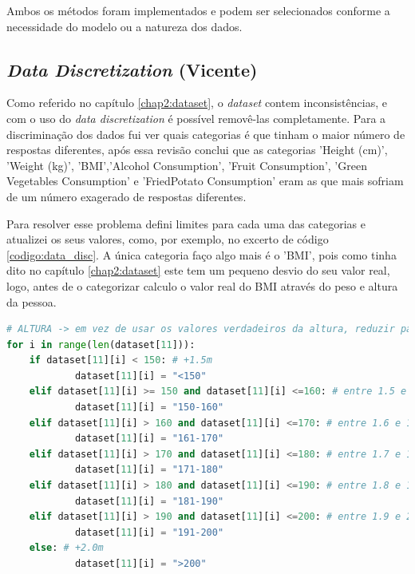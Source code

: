 Ambos os métodos foram implementados e podem ser selecionados conforme a necessidade do modelo ou a natureza dos dados.


\subsection{\textit{Data Discretization} (Vicente)}
\label{chap3:data_disc}

Como referido no capítulo \ref{chap2:dataset}, o \textit{dataset} contem inconsistências, e com o uso do \textit{data discretization} é possível removê-las completamente. Para a discriminação dos dados fui ver quais categorias é que tinham o maior número de respostas diferentes, após essa revisão conclui que as categorias 'Height (cm)', 'Weight (kg)', 'BMI','Alcohol Consumption', 'Fruit Consumption', 'Green Vegetables Consumption' e 'FriedPotato Consumption' eram as que mais sofriam de um número exagerado de respostas diferentes.

Para resolver esse problema defini limites para cada uma das categorias e atualizei os seus valores, como, por exemplo, no excerto de código \ref{codigo:data_disc}. A única categoria faço algo mais é o 'BMI', pois como tinha dito no capítulo \ref{chap2:dataset} este tem um pequeno desvio do seu valor real, logo, antes de o categorizar calculo o valor real do BMI através do peso e altura da pessoa.

\begin{lstlisting}[caption={Excerto de código utilizado para substituir todos os valores numericos da categoria 'Height (cm)' por valores categoricos.}, language=Python, label={codigo:data_disc}]
# ALTURA -> em vez de usar os valores verdadeiros da altura, reduzir para algumas categorias genericas
for i in range(len(dataset[11])):
    if dataset[11][i] < 150: # +1.5m
			dataset[11][i] = "<150"
    elif dataset[11][i] >= 150 and dataset[11][i] <=160: # entre 1.5 e 1.6 m
			dataset[11][i] = "150-160"
    elif dataset[11][i] > 160 and dataset[11][i] <=170: # entre 1.6 e 1.7 m
			dataset[11][i] = "161-170"
    elif dataset[11][i] > 170 and dataset[11][i] <=180: # entre 1.7 e 1.8 m
			dataset[11][i] = "171-180"
    elif dataset[11][i] > 180 and dataset[11][i] <=190: # entre 1.8 e 1.9 m
			dataset[11][i] = "181-190"
    elif dataset[11][i] > 190 and dataset[11][i] <=200: # entre 1.9 e 2.0 m
			dataset[11][i] = "191-200"
    else: # +2.0m
			dataset[11][i] = ">200"
\end{lstlisting}


